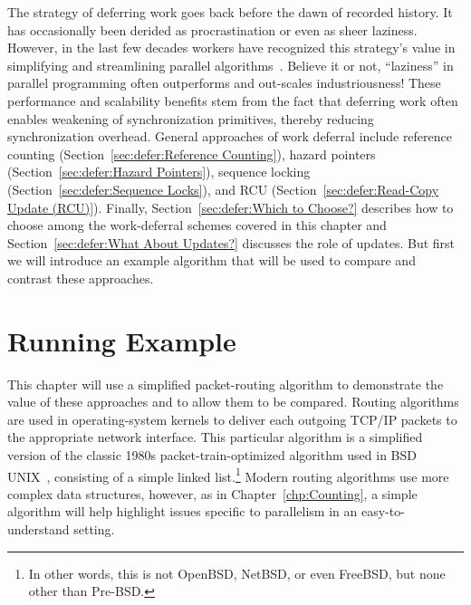 
%

The strategy of deferring work goes back before the dawn of recorded
history. It has occasionally been derided as procrastination or
even as sheer laziness.
However, in the last few decades workers have recognized this strategy's value
in simplifying and streamlining parallel algorithms~\cite{Kung80,HMassalinPhD}.
Believe it or not, ``laziness'' in parallel programming often outperforms and
out-scales industriousness!
These performance and scalability benefits stem from the fact that
deferring work often enables weakening of synchronization primitives,
thereby reducing synchronization overhead.
General approaches of work deferral include
reference counting (Section~\ref{sec:defer:Reference Counting}),
hazard pointers (Section~\ref{sec:defer:Hazard Pointers}),
sequence locking (Section~\ref{sec:defer:Sequence Locks}),
and RCU (Section~\ref{sec:defer:Read-Copy Update (RCU)}).
Finally, Section~\ref{sec:defer:Which to Choose?}
describes how to choose among the work-deferral schemes covered in
this chapter and Section~\ref{sec:defer:What About Updates?}
discusses the role of updates.
But first we will introduce an example algorithm that will be used
to compare and contrast these approaches.

\section{Running Example}
\label{sec:defer:Running Example}

This chapter will use a simplified packet-routing algorithm to demonstrate
the value of these approaches and to allow them to be compared.
Routing algorithms are used in operating-system kernels to
deliver each outgoing TCP/IP packets to the appropriate network interface.
This particular algorithm is a simplified version of the classic 1980s
packet-train-optimized algorithm used in BSD UNIX~\cite{VanJacobson88},
consisting of a simple linked list.\footnote{
	In other words, this is not OpenBSD, NetBSD, or even
	FreeBSD, but none other than Pre-BSD.}
Modern routing algorithms use more complex data structures, however, as in
Chapter~\ref{chp:Counting}, a simple algorithm will
help highlight issues specific to parallelism in an
easy-to-understand setting.

